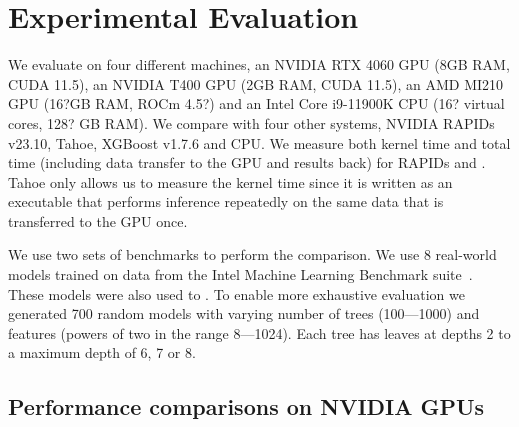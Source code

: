 \section{Experimental Evaluation}
\label{sec:results}

We evaluate \Treebeard{} on four different machines, an NVIDIA RTX 4060 GPU (8GB RAM, CUDA 11.5), an NVIDIA T400 GPU (2GB RAM, CUDA 11.5), an AMD MI210 GPU (16?GB RAM, ROCm 4.5?) and an Intel Core i9-11900K CPU (16? virtual cores, 128? GB RAM). We compare \Treebeard{} with four other systems, NVIDIA RAPIDs v23.10, Tahoe, XGBoost v1.7.6 and \TreebeardOLD{} CPU. We measure both kernel time and total time (including data transfer to the GPU and results back) for RAPIDs and \Treebeard{}. Tahoe only allows us to measure the kernel time since it is written as an executable that performs inference repeatedly on the same data that is transferred to the GPU once.

We use two sets of benchmarks to perform the comparison.
We use 8 real-world models trained on data from the Intel Machine Learning Benchmark suite~\cite{}. These models were also used to \TreebeardOLD{}\cite{Treebeard}.
To enable more exhaustive evaluation we generated 700 random models with varying number of trees (100---1000) and features (powers of two in the range 8---1024). Each tree has leaves at depths 2 to a maximum depth of 6, 7 or 8. 
\subsection{Performance comparisons on NVIDIA GPUs}
